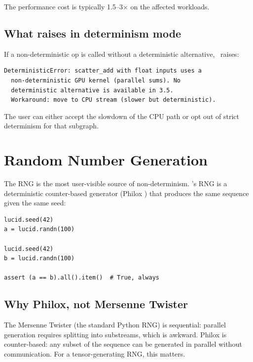 The performance cost is typically 1.5--3$\times$ on the
affected workloads.

\subsection{What raises in determinism mode}
\label{ssec:reproducibility:det_raises}

If a non-deterministic op is called without a deterministic
alternative, \Lucid\ raises:

\begin{lstlisting}[style=lucid,language=LucidPython]
DeterministicError: scatter_add with float inputs uses a
  non-deterministic GPU kernel (parallel sums). No
  deterministic alternative is available in 3.5.
  Workaround: move to CPU stream (slower but deterministic).
\end{lstlisting}

The user can either accept the slowdown of the CPU path or
opt out of strict determinism for that subgraph.

\section{Random Number Generation}
\label{sec:reproducibility:rng}

The RNG is the most user-visible source of non-determinism.
\Lucid's RNG is a deterministic counter-based generator
(Philox \cite{philox_salmon_2011}) that produces the same
sequence given the same seed:

\begin{lstlisting}[style=lucid,language=LucidPython]
lucid.seed(42)
a = lucid.randn(100)

lucid.seed(42)
b = lucid.randn(100)

assert (a == b).all().item()  # True, always
\end{lstlisting}

\subsection{Why Philox, not Mersenne Twister}
\label{ssec:reproducibility:why_philox}

The Mersenne Twister \cite{matsumoto_mt_1998} (the standard
Python RNG) is sequential: parallel generation requires
splitting into substreams, which is awkward. Philox is
counter-based: any subset of the sequence can be generated
in parallel without communication. For a tensor-generating
RNG, this matters.

